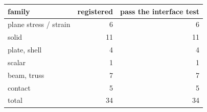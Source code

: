 \begin{tabular}{lrr}
\toprule
family & registered & pass the interface test \\
\midrule
plane stress / strain & 6 & 6 \\
solid & 11 & 11 \\
plate, shell & 4 & 4 \\
scalar & 1 & 1 \\
beam, truss & 7 & 7 \\
contact & 5 & 5 \\
\midrule
total & 34 & 34 \\
\bottomrule
\end{tabular}

